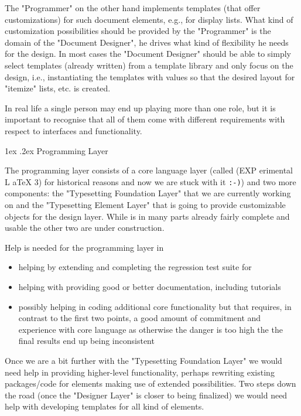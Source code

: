 \documentclass{ltnews}
\makeatletter
\newcommand{\@subheadingfont}{%
   \sffamily\slshape
   \let\LaTeX\cmssLaTeX\let\TeX\cmssTeX
}
\renewcommand{\subsection}{%
   \@startsection
      {section}{1}{\z@}{-1.5ex \@plus -1ex \@minus -.2ex}%
      {1ex \@plus.2ex}{\@subheadingfont}%
}
\makeatother
\begin{document}
The "Programmer" on the other hand implements templates (that offer customizations) for such document elements, e.g., for display lists. What kind of customization possibilities should be provided by the "Programmer" is the domain of the "Document Designer", he drives what kind of flexibility he needs for the design. In most cases the "Document Designer" should be able to simply select templates (already written) from a template library and only focus on the design, i.e., instantiating the templates with values so that the desired layout for "itemize" lists, etc. is created.

In real life a single person may end up playing more than one role, but it is important to recognise that all of them come with different requirements with respect to interfaces and functionality.

\subsection{Programming Layer}

The programming layer consists of a core language layer (called  (EXP erimental L aTeX 3) for historical reasons and now we are stuck with it \texttt{:-)}) and two more components: the "Typesetting Foundation Layer" that we are currently working on and the "Typesetting Element Layer" that is going to provide customizable objects for the design layer. While  is in many parts already fairly complete and usable the other two are under construction.

Help is needed for the programming layer in
\begin{itemize}
\item helping by extending and completing the regression test suite for 
\item helping with providing good or better documentation, including tutorials
\item possibly helping in coding additional core functionality but that requires, in contrast to the first two points, a good amount of commitment and experience with core language as otherwise the danger is too high the the final results end up being inconsistent
\end{itemize}
Once we are a bit further with the "Typesetting Foundation Layer" we would need help in
providing higher-level functionality, perhaps rewriting existing packages/code for elements making use of extended possibilities.
Two steps down the road (once the "Designer Layer" is closer to being finalized) we would need help with developing templates for all kind of elements.
\end{document}

